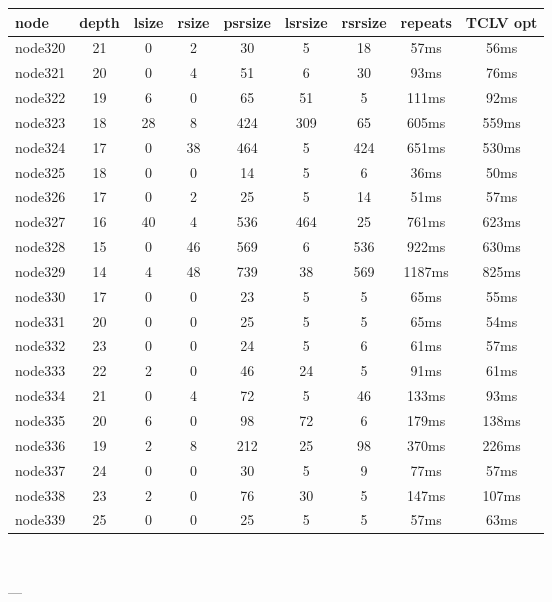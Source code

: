 \begin{tabular}{|l|c|c|c|c|c|c|c|c|}
\hline node & depth & lsize & rsize & psrsize & lsrsize & rsrsize   & repeats & TCLV opt\\
    \hline node320 & 21 & 0 & 2 & 30 & 5 & 18 & 57ms & 56ms\\
    \hline node321 & 20 & 0 & 4 & 51 & 6 & 30 & 93ms & 76ms\\
    \hline node322 & 19 & 6 & 0 & 65 & 51 & 5 & 111ms & 92ms\\
    \hline node323 & 18 & 28 & 8 & 424 & 309 & 65 & 605ms & 559ms\\
    \hline node324 & 17 & 0 & 38 & 464 & 5 & 424 & 651ms & 530ms\\
    \hline node325 & 18 & 0 & 0 & 14 & 5 & 6 & 36ms & 50ms\\
    \hline node326 & 17 & 0 & 2 & 25 & 5 & 14 & 51ms & 57ms\\
    \hline node327 & 16 & 40 & 4 & 536 & 464 & 25 & 761ms & 623ms\\
    \hline node328 & 15 & 0 & 46 & 569 & 6 & 536 & 922ms & 630ms\\
    \hline node329 & 14 & 4 & 48 & 739 & 38 & 569 & 1187ms & 825ms\\
    \hline node330 & 17 & 0 & 0 & 23 & 5 & 5 & 65ms & 55ms\\
    \hline node331 & 20 & 0 & 0 & 25 & 5 & 5 & 65ms & 54ms\\
    \hline node332 & 23 & 0 & 0 & 24 & 5 & 6 & 61ms & 57ms\\
    \hline node333 & 22 & 2 & 0 & 46 & 24 & 5 & 91ms & 61ms\\
    \hline node334 & 21 & 0 & 4 & 72 & 5 & 46 & 133ms & 93ms\\
    \hline node335 & 20 & 6 & 0 & 98 & 72 & 6 & 179ms & 138ms\\
    \hline node336 & 19 & 2 & 8 & 212 & 25 & 98 & 370ms & 226ms\\
    \hline node337 & 24 & 0 & 0 & 30 & 5 & 9 & 77ms & 57ms\\
    \hline node338 & 23 & 2 & 0 & 76 & 30 & 5 & 147ms & 107ms\\
    \hline node339 & 25 & 0 & 0 & 25 & 5 & 5 & 57ms & 63ms\\

\hline
\end{tabular} \

---


